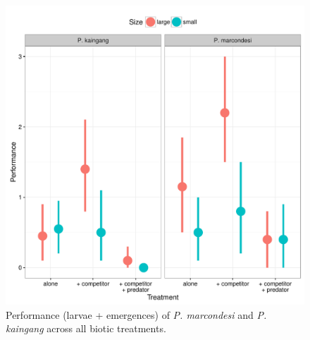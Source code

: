 \begin{figure}[htbp]
\centering
\includegraphics[width=5.5in]{figures/anova_data.pdf}
\caption[Performance (larvae + emergences) of \emph{P. marcondesi} and
\emph{P. kaingang}.]{Performance (larvae + emergences) of \emph{P. marcondesi} and
\emph{P. kaingang} across all biotic treatments.}
\end{figure}

